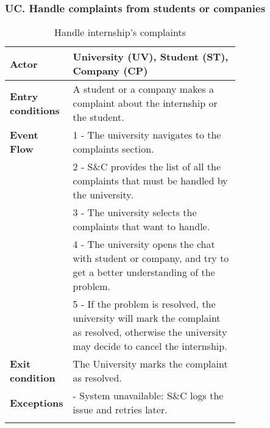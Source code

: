 \subsubsection*{UC\cuc . Handle complaints from students or companies}
\begin{center}
    \begin{longtable}{|l|p{0.75\linewidth}|}
        \hline
        \textbf{Actor}            & University (UV), Student (ST), Company (CP) \\
        \hline
        \textbf{Entry conditions} & A student or a company makes a complaint about the internship or the student. \\
        \hline
        \textbf{Event Flow}       & 1 - The university navigates to the complaints section. \\
        & 2 - S\&C provides the list of all the complaints that must be handled by the university. \\
        & 3 - The university selects the complaints that want to handle. \\
        & 4 - The university opens the chat with student or company, and try to get a better understanding of the problem. \\
        & 5 - If the problem is resolved, the university will mark the complaint as resolved, otherwise the university may decide to cancel the internship. \\
        \hline
        \textbf{Exit condition}   & The University marks the complaint as resolved. \\       
        \hline
        \textbf{Exceptions}       & - System unavailable: S\&C logs the issue and retries later. \\
        \hline
        \caption{Handle internship's complaints}
        \label{tab:handle_internships_complaints_usecase}
    \end{longtable}
\end{center}

